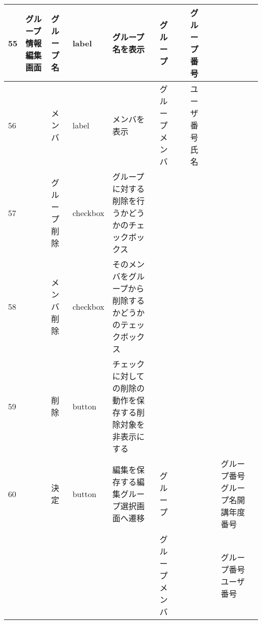 \newpage
\begin{table}[]
\centering
\begin{tabular}{|l|l|l|l|l|l|l|l|l|l|l|}
\hline
55  & グループ情報編集画面    & グループ名            & label    & グループ名を表示                                                          & グループ    &                       & グループ番号             &                 &                               &                                                                \\ \hline
56  &               & メンバ              & label    & メンバを表示                                                            & グループメンバ &                       & ユーザ番号氏名            &                 &                               &                                                                \\ \hline
57  &               & グループ削除           & checkbox & グループに対する削除を行うかどうかのチェックボックス                                        &         &                       &                    &                 &                               &                                                                \\ \hline
58  &               & メンバ削除            & checkbox & そのメンバをグループから削除するかどうかのテェックボックス                                     &         &                       &                    &                 &                               &                                                                \\ \hline
59  &               & 削除               & button   & チェックに対しての削除の動作を保存する削除対象を非表示にする                                    &         &                       &                    &                 &                               &                                                                \\ \hline
60  &               & 決定               & button   & 編集を保存する編集グループ選択画面へ遷移                                              & グループ    &                       &                    &                 & グループ番号グループ名開講年度番号             &                                                                \\ \hline
    &               &                  &          &                                                                   & グループメンバ &                       &                    &                 & グループ番号ユーザ番号                   &                                                                \\ \hline

\end{tabular}
\end{table}
